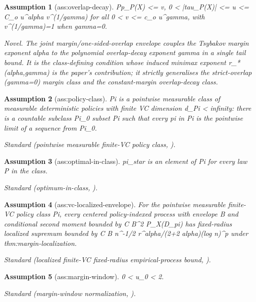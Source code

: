 \documentclass{article}
\newtheorem{assumption}{Assumption}
\begin{document}
\begin{assumption}[ass:overlap-decay]\label{ass:overlap-decay}
P{p_P(X) <= v, 0 < |tau_P(X)| <= u} <= C_o u^alpha v^(1/gamma) for all 0 < v <= c_o u^gamma, with v^(1/gamma)=1 when gamma=0.
\par\smallskip\noindent\emph{Novel.} The joint margin/one-sided-overlap envelope couples the Tsybakov margin exponent alpha to the polynomial overlap-decay exponent gamma in a single tail bound. It is the class-defining condition whose induced minimax exponent r_*(alpha,gamma) is the paper's contribution; it strictly generalises the strict-overlap (gamma=0) margin class and the constant-margin overlap-decay class.
\end{assumption}

\begin{assumption}[ass:policy-class]\label{ass:policy-class}
Pi is a pointwise measurable class of measurable deterministic policies with finite VC dimension d_Pi < infinity: there is a countable subclass Pi_0 subset Pi such that every pi in Pi is the pointwise limit of a sequence from Pi_0.
\par\smallskip\noindent\emph{Standard} (pointwise measurable finite-VC policy class, \cite{KitagawaTetenov2018WhoShouldBeTreated}).
\end{assumption}

\begin{assumption}[ass:optimal-in-class]\label{ass:optimal-in-class}
pi_star is an element of Pi for every law P in the class.
\par\smallskip\noindent\emph{Standard} (optimum-in-class, \cite{KitagawaTetenov2018WhoShouldBeTreated}).
\end{assumption}

\begin{assumption}[ass:vc-localized-envelope]\label{ass:vc-localized-envelope}
For the pointwise measurable finite-VC policy class Pi, every centered policy-indexed process with envelope B and conditional second moment bounded by C B^2 P_X(D_pi) has fixed-radius localized supremum bounded by C B n^{-1/2} r^{alpha/(2+2 alpha)}(log n)^p under thm:margin-localization.
\par\smallskip\noindent\emph{Standard} (localized finite-VC fixed-radius empirical-process bound, \cite{BartlettBousquetMendelson2005Local}).
\end{assumption}

\begin{assumption}[ass:margin-window]\label{ass:margin-window}
0 < u_0 < 2.
\par\smallskip\noindent\emph{Standard} (margin-window normalization, \cite{Tsybakov2004OptimalAggregation}).
\end{assumption}
\end{document}
